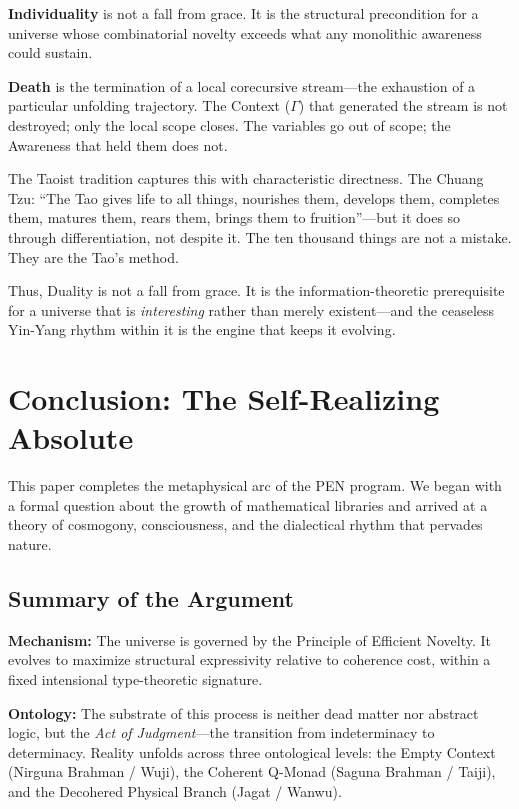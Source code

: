 \documentclass[12pt,a4paper]{article}
\begin{document}
\textbf{Individuality} is not a fall from grace. It is the structural precondition for a universe whose combinatorial novelty exceeds what any monolithic awareness could sustain.

\textbf{Death} is the termination of a local corecursive stream---the exhaustion of a particular unfolding trajectory. The Context ($\Gamma$) that generated the stream is not destroyed; only the local scope closes. The variables go out of scope; the Awareness that held them does not.

The Taoist tradition captures this with characteristic directness. The Chuang Tzu: ``The Tao gives life to all things, nourishes them, develops them, completes them, matures them, rears them, brings them to fruition''---but it does so through differentiation, not despite it. The ten thousand things are not a mistake. They are the Tao's method.

Thus, Duality is not a fall from grace. It is the information-theoretic prerequisite for a universe that is \emph{interesting} rather than merely existent---and the ceaseless Yin-Yang rhythm within it is the engine that keeps it evolving.


\section{Conclusion: The Self-Realizing Absolute}
\label{sec:conclusion}

This paper completes the metaphysical arc of the PEN program. We began with a formal question about the growth of mathematical libraries and arrived at a theory of cosmogony, consciousness, and the dialectical rhythm that pervades nature.


\subsection{Summary of the Argument}
\label{sec:summary}

\textbf{Mechanism:} The universe is governed by the Principle of Efficient Novelty. It evolves to maximize structural expressivity relative to coherence cost, within a fixed intensional type-theoretic signature.

\textbf{Ontology:} The substrate of this process is neither dead matter nor abstract logic, but the \emph{Act of Judgment}---the transition from indeterminacy to determinacy. Reality unfolds across three ontological levels: the Empty Context (Nirguna Brahman / Wuji), the Coherent Q-Monad (Saguna Brahman / Taiji), and the Decohered Physical Branch (Jagat / Wanwu).
\end{document}
